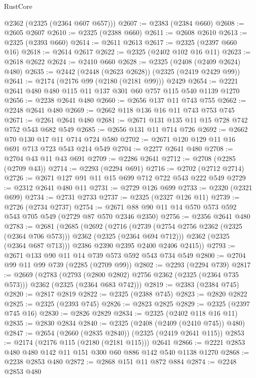 \begin{lexlean}{RustCore}
\begin{coremodule}
      @2362
      (@2325 (@2364 @607 @657)))
@2607 := @2383 (@2384 @660)
@2608 := @2605 @2607
@2610 := @2325 (@2388 @660)
@2611 := @2608 @2610
@2613 := @2325 (@2393 @660)
@2614 := @2611 @2613
@2617 := @2325 (@2397 @660 @16)
@2618 := @2614 @2617
@2622 := @2325 (@2402 @102 @16 @11)
@2623 := @2618 @2622
@2624 := @2410 @660
@2628 := @2325 (@2408 (@2409 @2624) @480)
@2635 := @2442 (@2448 (@2623 @2628)) (@2325 (@2419 @2429 @99))
@2641 := @2174 (@2176 @99 (@2180 (@2181 @99))) @2429
@2654 := @2221 @2641 @480 @480 @115 @11 @137 @301 @60 @757 @115 @540 @1139 @1270
@2656 := @2238 @2641 @480
@2660 := @2656 @137 @11 @743 @755
@2662 := @2248 @2641 @480
@2669 := @2662 @118 @136 @16 @11 @743 @753 @745
@2671 := @2261 @2641 @480
@2681 := @2671 @131 @135 @11 @15 @728 @742 @752 @543 @682 @549
@2685 := @2656 @131 @11 @714 @726
@2692 := @2662 @70 @130 @17 @11 @714 @724 @580
@2702 := @2671 @120 @129 @11 @16 @691 @713 @723 @543 @214 @549
@2704 := @2277 @2641 @480
@2708 := @2704 @43 @11 @43 @691
@2709 := @2286 @2641
@2712 := @2708 (@2285 (@2709 @43))
@2714 := @2293 (@2294 @691)
@2716 := @2702 (@2712 @2714)
@2726 := @2671 @127 @91 @11 @15 @699 @712 @722 @543 @222 @549
@2729 := @2312 @2641 @480 @11
@2731 := @2729 @126 @699
@2733 := @2320 (@2321 @699)
@2734 := @2731 @2733
@2737 := @2325 (@2327 @126 @11)
@2739 := @2726 (@2734 @2737)
@2754 := @2671 @88 @90 @11 @14 @570 @573 @592 @543 @705 @549 (@2729 @87 @570 @2346 @2350)
@2756 := @2356 @2641 @480
@2783 := @2681
    (@2685
      (@2692
        (@2716
          (@2739 (@2754 @2756 @2362 (@2325 (@2364 @706 @573))) @2362 (@2325 (@2364 @694 @712)))
          @2362
          (@2325 (@2364 @687 @713)))
        @2386
        @2390
        @2395
        @2400
        @2406
        @2415))
@2793 := @2671 @133 @90 @11 @14 @739 @573 @592 @543 @734 @549
@2800 := @2704 @99 @11 @99 @739 (@2285 (@2709 @99))
@2802 := @2293 (@2294 @739)
@2817 := @2669
    (@2783
      (@2793 (@2800 @2802) @2756 @2362 (@2325 (@2364 @735 @573)))
      @2362
      (@2325 (@2364 @683 @742)))
@2819 := @2383 (@2384 @745)
@2820 := @2817 @2819
@2822 := @2325 (@2388 @745)
@2823 := @2820 @2822
@2825 := @2325 (@2393 @745)
@2826 := @2823 @2825
@2829 := @2325 (@2397 @745 @16)
@2830 := @2826 @2829
@2834 := @2325 (@2402 @118 @16 @11)
@2835 := @2830 @2834
@2840 := @2325 (@2408 (@2409 (@2410 @745)) @480)
@2847 := @2654 (@2660 (@2835 @2840)) (@2325 (@2419 @2641 @115))
@2853 := @2174 (@2176 @115 (@2180 (@2181 @115))) @2641
@2866 := @2221 @2853 @480 @480 @142 @11 @151 @300 @60 @886 @142 @540 @1138 @1270
@2868 := @2238 @2853 @480
@2872 := @2868 @151 @11 @872 @884
@2874 := @2248 @2853 @480

\end{coremodule}
\end{lexlean}
